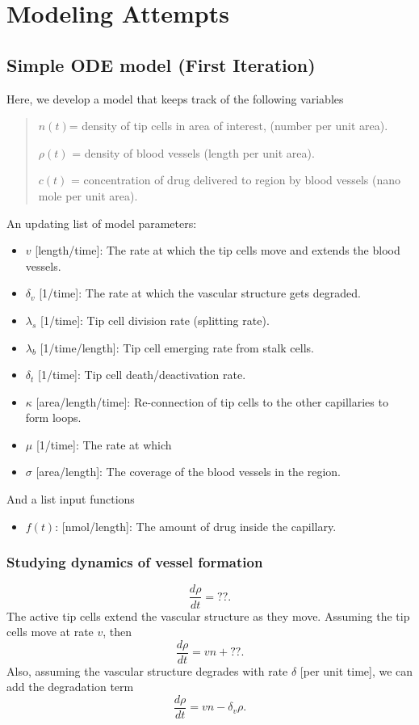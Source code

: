 \chapter{Modeling Attempts}

\section{Simple ODE model (First Iteration)}
Here, we develop a model that keeps track of the following variables
\begin{quote}
	$n(t)$= density of tip cells in area of interest, (number per unit area).
	
	$\rho(t)$ = density of blood vessels (length per unit area).
	
	$c(t)$ = concentration of drug delivered to region by blood vessels (nano mole per unit area).
\end{quote}
An updating list of model parameters:
\begin{itemize}
	\item $v$ [length/time]: The rate at which the tip cells move and extends the blood vessels.
	\item $\delta_v$ [1/time]: The rate at which the vascular structure gets degraded.
	\item $\lambda_s$ [1/time]: Tip cell division rate (splitting rate).
	\item $\lambda_b$ [1/time/length]: Tip cell emerging rate from stalk cells.
	\item $\delta_t$ [1/time]: Tip cell death/deactivation rate.
	\item $\kappa$ [area/length/time]: Re-connection of tip cells to the other capillaries to form loops.  
	\item $\mu$ [1/time]: The rate at which 
	\item $\sigma$ [area/length]: The coverage of the blood vessels in the region.
\end{itemize}
And a list input functions
\begin{itemize}
	\item $f(t)$: [nmol/length]: The amount of drug inside the capillary.
\end{itemize}




\subsection*{Studying dynamics of vessel formation}
\[ \frac{d\rho}{dt} = ??. \]
The active tip cells extend the vascular structure as they move. Assuming the tip cells move at rate $v$, then 
\[ \frac{d \rho}{dt} = vn+ ??. \]
Also, assuming the vascular structure degrades with rate $\delta$ [per unit time], we can add the degradation term 
\[ \boxed{\frac{d\rho}{dt} = vn - \delta_v \rho} . \]



